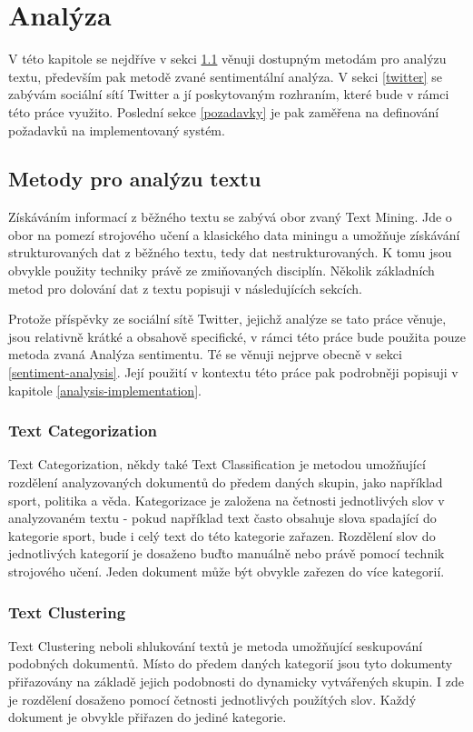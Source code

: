 \documentclass[thesis=B,czech]{FITthesis}[2012/06/26]
\begin{document}
\chapter{Analýza}
V této kapitole se nejdříve v sekci \ref{text-mining} věnuji dostupným metodám pro analýzu textu, především pak metodě zvané sentimentální analýza. V sekci \ref{twitter} se zabývám sociální sítí Twitter a jí poskytovaným rozhraním, které bude v rámci této práce využito. Poslední sekce \ref{pozadavky} je pak zaměřena na definování požadavků na implementovaný systém. 


\section{Metody pro analýzu textu}
\label{text-mining}
	Získáváním informací z běžného textu se zabývá obor zvaný Text Mining. Jde o obor na pomezí strojového učení a klasického data miningu a umožňuje získávání strukturovaných dat z běžného textu, tedy dat nestrukturovaných. K tomu jsou obvykle použity techniky právě ze zmiňovaných disciplín. Několik základních metod pro dolování dat z textu popisuji v následujících sekcích. 
	
	Protože příspěvky ze sociální sítě Twitter, jejichž analýze se tato práce věnuje, jsou relativně krátké a obsahově specifické, v rámci této práce bude použita pouze metoda zvaná Analýza sentimentu. Té se věnuji nejprve obecně v sekci \ref{sentiment-analysis}. Její použití v kontextu této práce pak podrobněji popisuji v kapitole \ref{analysis-implementation}. 
	
\subsection{Text Categorization}
	Text Categorization, někdy také Text Classification je metodou umožňující rozdělení analyzovaných dokumentů do předem daných skupin, jako například sport, politika a věda. Kategorizace je založena na četnosti jednotlivých slov v analyzovaném textu - pokud například text často obsahuje slova spadající do kategorie sport, bude i celý text do této kategorie zařazen. Rozdělení slov do jednotlivých kategorií je dosaženo buďto manuálně nebo právě pomocí technik strojového učení. Jeden dokument může být obvykle zařezen do více kategorií. 

\subsection{Text Clustering}
	Text Clustering neboli shlukování textů je metoda umožňující seskupování podobných dokumentů. Místo do předem daných kategorií jsou tyto dokumenty přiřazovány na základě jejich podobnosti do dynamicky vytvářených skupin. I zde je rozdělení dosaženo pomocí četnosti jednotlivých použítých slov. Každý dokument je obvykle přiřazen do jediné kategorie. 
\end{document}
